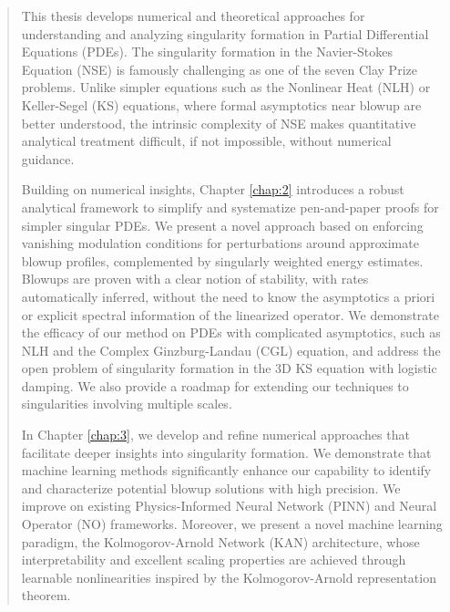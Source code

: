 \documentclass[12pt]{caltech_thesis}
\numberwithin{equation}{section}
\begin{document}
\begin{abstract}
  This thesis develops numerical and theoretical approaches for understanding and analyzing singularity formation in Partial Differential Equations (PDEs). The singularity formation in the Navier-Stokes Equation (NSE) is famously challenging as one of the seven Clay Prize problems. Unlike simpler equations such as the Nonlinear Heat (NLH) or Keller-Segel (KS) equations, where formal asymptotics near blowup are better understood, the intrinsic complexity of NSE makes quantitative analytical treatment difficult, if not impossible, without numerical guidance. 

  Building on numerical insights, Chapter \ref{chap:2} introduces a robust analytical framework to simplify and systematize pen-and-paper proofs for simpler singular PDEs.  We present a novel approach based on enforcing vanishing modulation conditions for perturbations around approximate blowup profiles, complemented by singularly weighted energy estimates. Blowups are proven with a clear notion of stability, with rates automatically inferred,  without the need to know the asymptotics a priori or explicit spectral information of the linearized operator. We demonstrate the efficacy of our method on PDEs with complicated asymptotics, such as NLH and the Complex Ginzburg-Landau (CGL) equation, and address the open problem of singularity formation in the 3D KS equation with logistic damping. We also provide a roadmap for extending our techniques to singularities involving multiple scales.

  In Chapter \ref{chap:3}, we develop and refine numerical approaches that facilitate deeper insights into singularity formation. We demonstrate that machine learning methods significantly enhance our capability to identify and characterize potential blowup solutions with high precision. We improve on existing Physics-Informed Neural Network (PINN) and Neural Operator (NO)  frameworks. Moreover, we present a novel machine learning paradigm, the Kolmogorov-Arnold Network (KAN) architecture, whose interpretability and excellent scaling properties are achieved through learnable nonlinearities inspired by the Kolmogorov-Arnold representation theorem.
  
  

\end{abstract}
\end{document}
